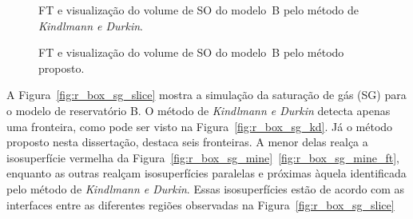 \begin{figure}[H]
	\centering
	\caption{FT e visualização do volume de SO do modelo~B pelo método de \textit{Kindlmann e Durkin}.}
	\label{fig:r_box_so_kd}
\end{figure}

\begin{figure}[h]
	\centering
	\caption{FT e visualização do volume de SO do modelo~B pelo método proposto.}
	\label{fig:r_box_so_mine}
\end{figure}

	A Figura~\ref{fig:r_box_sg_slice} mostra a simulação da saturação de gás (SG) para o modelo de reservatório B. O método de \textit{Kindlmann e Durkin} detecta apenas uma fronteira, como pode ser visto na Figura~\ref{fig:r_box_sg_kd}. Já o método proposto nesta dissertação, destaca seis fronteiras. A menor delas realça a isosuperfície vermelha da Figura~\ref{fig:r_box_sg_mine}~\ref{fig:r_box_sg_mine_ft}, enquanto as outras realçam isosuperfícies paralelas e próximas àquela identificada pelo método de \textit{Kindlmann e Durkin}. Essas isosuperfícies estão de acordo com as interfaces entre as diferentes regiões observadas na Figura~\ref{fig:r_box_sg_slice}
	
